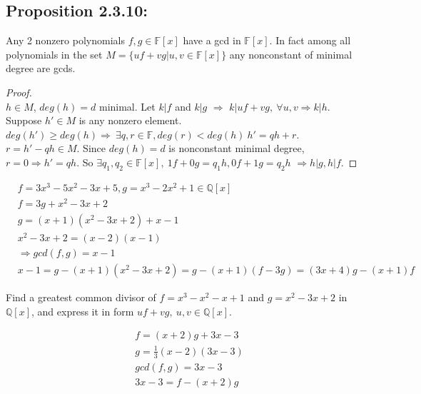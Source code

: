 \documentclass[11pt]{elegantbook}
\begin{document}
{\subsection{Proposition 2.3.10:}
\begin{proposition}[Proposition 2.3.10]
    Any 2 nonzero polynomials $f , g \in \mathbb{F}[x]$ have
    a gcd in $\mathbb{F}[x]$. In fact among all polynomials
    in the set
    $M = \{uf + vg|u, v \in \mathbb{F}[x]\}$
    any nonconstant of minimal degree are gcds.
\end{proposition}
\begin{proof}
\quad\\
$h\in M$, $deg(h)=d$ minimal. Let $k|f$ and $k|g$ $\Rightarrow$ $k|uf+vg,\ \forall u,v\Rightarrow k|h$.\\
Suppose $h'\in M$ is any nonzero element. $deg(h')\geq deg(h)\Rightarrow\ \exists q,r\in\mathbb{F},deg(r)<deg(h)\ h'=qh+r$. $r=h'-qh\in M$. Since $deg(h)=d$ is nonconstant minimal degree, $r=0\Rightarrow h'=qh$. So $\exists q_1,q_2\in\mathbb{F}[x],\ 1f+0g=q_1h, 0f+1g=q_2h$ $\Rightarrow h|g,h|f$.
\end{proof}
\begin{example}
    \begin{equation}
        \begin{aligned}
            &f = 3x^3 - 5x^2 - 3x + 5, g = x^3-2x^2 + 1 \in \mathbb{Q}[x]\\
            &f=3g+x^2-3x+2\\
            &g=(x+1)(x^2-3x+2)+x-1\\
            &x^2-3x+2=(x-2)(x-1)\\
            &\Rightarrow gcd(f,g)=x-1\\
            &x-1=g-(x+1)(x^2-3x+2)=g-(x+1)(f-3g)=(3x+4)g-(x+1)f
        \end{aligned}
        \nonumber
    \end{equation}
\end{example}
\begin{example}
    Find a greatest common divisor of $f=x^3-x^2-x+1$ and $g=x^2-3x+2$ in $\mathbb{Q}[x]$, and express it in form $uf+vg,\ u,v\in\mathbb{Q}[x]$.
\end{example}
\begin{equation}
    \begin{aligned}
        &f=(x+2)g+3x-3\\
        &g=\frac{1}{3}(x-2)(3x-3)\\
        &gcd(f,g)=3x-3\\
        &3x-3=f-(x+2)g
    \end{aligned}
    \nonumber
\end{equation}
}
\end{document}
